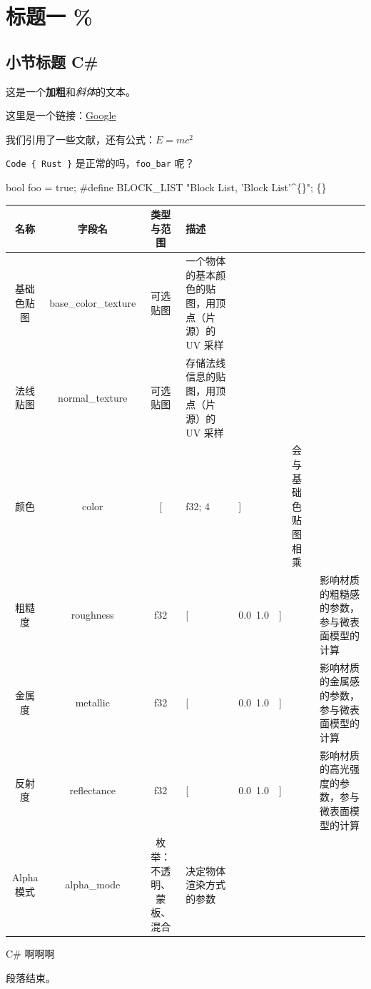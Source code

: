\chapter{标题一 {\%}}
\section{小节标题 C\#}
这是一个\textbf{加粗}和\textit{斜体}的文本。

这里是一个链接：\href{https://www.google.com}{Google}

我们引用了一些文献\cite{foo}，还有公式：$E = mc^2$

\texttt{Code \{ Rust \}} 是正常的吗，\texttt{foo\_bar} 呢？

bool foo = true;
\#define BLOCK\_LIST "Block List, 'Block List'^\{\}";
\{\}
\begin{tabular}{|c|c|c|} \hline
名称 & 字段名 & 类型与范围 & 描述 \\ \hline
基础色贴图 & base\_color\_texture & 可选贴图 & 一个物体的基本颜色的贴图，用顶点（片源）的 UV 采样 \\ \hline
法线贴图 & normal\_texture & 可选贴图 & 存储法线信息的贴图，用顶点（片源）的 UV 采样 \\ \hline
颜色 & color & [ & f32; 4 & ] &  & 会与基础色贴图相乘 \\ \hline
粗糙度 & roughness & f32  & [ & 0.0~1.0 & ] &  & 影响材质的粗糙感的参数，参与微表面模型的计算 \\ \hline
金属度 & metallic & f32  & [ & 0.0~1.0 & ] &  & 影响材质的金属感的参数，参与微表面模型的计算 \\ \hline
反射度 & reflectance & f32  & [ & 0.0~1.0 & ] &  & 影响材质的高光强度的参数，参与微表面模型的计算 \\ \hline
Alpha 模式 & alpha\_mode & 枚举：不透明、蒙板、混合 & 决定物体渲染方式的参数 \\ \hline
\end{tabular}

C\# 啊啊啊

段落结束。


